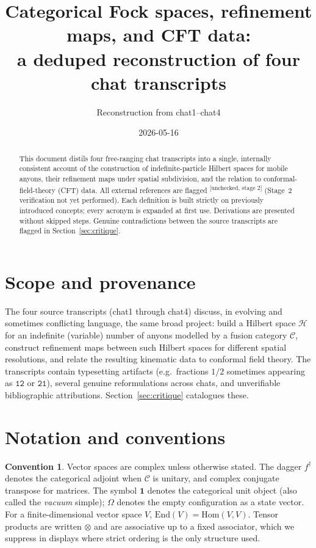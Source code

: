 \documentclass[11pt,a4paper]{article}
\title{Categorical Fock spaces, refinement maps, and CFT data:\\
a deduped reconstruction of four chat transcripts}
\author{Reconstruction from chat1--chat4}
\date{2026-05-16}
\theoremstyle{definition}
\newtheorem{convention}[definition]{Convention}
\newcommand{\Cc}{\mathcal{C}}
\newcommand{\Hh}{\mathcal{H}}
\newcommand{\Hom}{\mathrm{Hom}}
\newcommand{\End}{\mathrm{End}}
\newcommand{\one}{\mathbf{1}}
\newcommand{\vac}{\Omega}
\newcommand{\unchecked}{\textsuperscript{\textcolor{red!70!black}{[unchecked, stage 2]}}}
\begin{document}
\maketitle

\begin{abstract}
This document distils four free-ranging chat transcripts into a single,
internally consistent account of the construction of indefinite-particle
Hilbert spaces for mobile anyons, their refinement maps under spatial
subdivision, and the relation to conformal-field-theory (CFT) data. All
external references are flagged \unchecked{} (Stage~2 verification not yet
performed). Each definition is built strictly on previously introduced
concepts; every acronym is expanded at first use. Derivations are presented
without skipped steps. Genuine contradictions between the source transcripts
are flagged in Section~\ref{sec:critique}.
\end{abstract}

\tableofcontents

\section{Scope and provenance}

The four source transcripts (chat1 through chat4) discuss, in evolving and
sometimes conflicting language, the same broad project: build a Hilbert space
$\Hh$ for an indefinite (variable) number of anyons modelled by a fusion
category $\Cc$, construct refinement maps between such Hilbert spaces for
different spatial resolutions, and relate the resulting kinematic data to
conformal field theory. The transcripts contain typesetting artifacts (e.g.\
fractions $1/2$ sometimes appearing as $\texttt{12}$ or $\texttt{21}$),
several genuine reformulations across chats, and unverifiable bibliographic
attributions. Section~\ref{sec:critique} catalogues these.

\section{Notation and conventions}

\begin{convention}\label{conv:basics}
Vector spaces are complex unless otherwise stated. The dagger $f^\dagger$
denotes the categorical adjoint when $\Cc$ is unitary, and complex conjugate
transpose for matrices. The symbol $\one$ denotes the categorical unit
object (also called the \emph{vacuum} simple); $\vac$ denotes the empty
configuration as a state vector. For a finite-dimensional vector space $V$,
$\End(V) = \Hom(V,V)$. Tensor products are written $\otimes$ and are
associative up to a fixed associator, which we suppress in displays where
strict ordering is the only structure used.
\end{convention}
\end{document}
